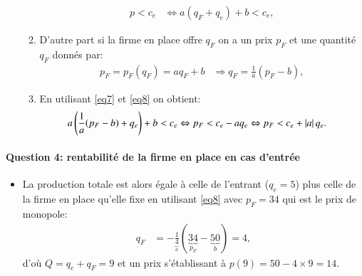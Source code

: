 \begin{frame}
\begin{itemize}
\begin{enumerate}[$\cdot$]
\begin{align}
p < c_e &\Leftrightarrow  a(q_F + q_e ) + b < c_e,
\label{eq7}
\end{align}
\item D'autre part si la firme en place offre $q_F$ on a un prix $p_F$ et une quantité $q_F$ donnés par:
\begin{align}
p_F = p_F(q_F) = aq_F+ b  &\Rightarrow q_F = \frac{1}{a}(p_F - b),
\label{eq8}
\end{align}
\item En utilisant \eqref{eq7} et \eqref{eq8} on obtient:
\begin{align*}
a\left( \frac{1}{a}(p_F - b) +  q_e \right) + b < c_e &\Leftrightarrow  p_F < c_e - aq_e \Leftrightarrow p_F < c_e + \left\vert {a} \right\vert q_e.
\end{align*}
\end{enumerate}
\end{itemize}
\end{frame}

\begin{frame}
[allowframebreaks]{\insertsection}
\framesubtitle{Question 4: rentabilité de la firme en place en cas d'entrée}
\begin{itemize}
\item La production totale est alors égale à celle de l’entrant ($q_e = 5$) plus celle de la firme en place qu'elle fixe  en utilisant \eqref{eq8} avec $p_F = 34$ qui est le prix de monopole:
\begin{align*}
q_F &=  -\frac{1}{\underbrace{4}_{a}}(\underbrace{34}_{p_F} - \underbrace{50}_{b}) = 4,
\end{align*}
d'où $Q = q_e+q_F = 9$ et un prix s'établissant à $p(9) = 50 - 4\times 9 = 14$.
\end{itemize}
\end{frame}

%
%


